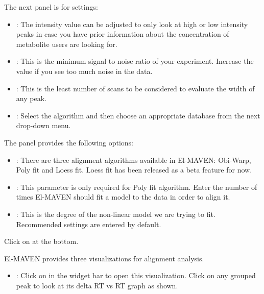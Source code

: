 \documentclass[letterpaper,10pt,english,openany,oneside]{sphinxmanual}
\begin{document}
The next panel is for  settings:
\begin{itemize}
\item {} 
: The intensity value can be adjusted to only look at high or low intensity peaks in case you have prior information about the concentration of metabolite users are looking for.

\item {} 
: This is the minimum signal to noise ratio of your experiment. Increase the value if you see too much noise in the data.

\item {} 
: This is the least number of scans to be considered to evaluate the width of any peak.

\item {} 
: Select the  algorithm and then choose an appropriate database from the next drop-down menu.

\end{itemize}

The  panel provides the following options:
\begin{itemize}
\item {} 
: There are three alignment algorithms available in El-MAVEN: Obi-Warp, Poly fit and Loess fit. Loess fit has been released as a beta feature for now.

\item {} 
: This parameter is only required for Poly fit algorithm. Enter the number of times El-MAVEN should fit a model to the data in order to align it.

\item {} 
: This is the degree of the non-linear model we are trying to fit. Recommended settings are entered by default.

\end{itemize}

Click on  at the bottom.


El-MAVEN provides three visualizations for alignment analysis.
\begin{itemize}
\item {} 
: Click on  in the widget bar to open this visualization. Click on any grouped peak to look at its delta RT vs RT graph as shown.

\end{itemize}
\end{document}
